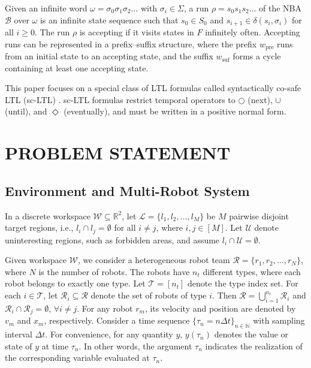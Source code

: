 \documentclass[lettersize,journal]{IEEEtran}
\begin{document}
Given an infinite word $\omega = \sigma_0\sigma_1\sigma_2\dots$ with $\sigma_i \in \Sigma$, a run $\rho = s_0s_1s_2\dots$ of the NBA $\mathcal{B}$ over $\omega$ is an infinite state sequence such that $s_0 \in S_0$ and $s_{i+1} \in \delta(s_i,\sigma_i)$ for all $i \ge 0$. The run $\rho$ is accepting if it visits states in $F$ infinitely often.
Accepting runs can be represented in a prefix–suffix structure, where the prefix $w_{\text{pre}}$ runs from an initial state to an accepting state, and the suffix $w_{\text{suf}}$ forms a cycle containing at least one accepting state.

This paper focuses on a special class of LTL formulas called syntactically co-safe LTL (sc-LTL) \cite{belta2017formal}. sc-LTL formulas restrict temporal operators to $\bigcirc$ (next), $\cup$ (until), and $\Diamond$ (eventually), and must be written in a positive normal form.


\section{PROBLEM STATEMENT}

\subsection{Environment and Multi-Robot System}
In a discrete workspace $\mathcal{W} \subseteq \mathbb{R}^2$, let $\mathcal{L}=\{l_1,l_2,\dots,l_M\}$ be $M$ pairwise disjoint target regions, i.e., $l_i\cap l_j=\emptyset$ for all $i\neq j$, where $i,j\in[M]$. Let $\mathcal{U}$ denote uninteresting regions, such as forbidden areas, and assume $l_i\cap\mathcal{U}=\emptyset$.

Given workspace $\mathcal{W}$, we consider a heterogeneous robot team $\mathcal{R} = \{ r_1, r_2, \dots, r_N\}$, where $N$ is the number of robots. The robots have $n_t$ different types, where each robot belongs to exactly one type. Let $\mathcal{T}=[n_t]$ denote the type index set. For each $i\in\mathcal{T}$, let $\mathcal{R}_i\subseteq\mathcal{R}$ denote the set of robots of type $i$. Then $\mathcal{R}=\bigcup_{i=1}^{n_t}\mathcal{R}_i$ and $\mathcal{R}_i\cap\mathcal{R}_j=\emptyset$, $\forall i\neq j$. For any robot $r_m$, its velocity and position are denoted by $v_m$ and $x_m$, respectively.
Consider a time sequence $\{ \tau_n = n \Delta t \}_{n \in \mathbb{N}}$ with sampling interval $\Delta t$.
For convenience, for any quantity $y$, $y(\tau_n)$ denotes the value or state of $y$ at time $\tau_n$. In other words, the argument $\tau_n$ indicates the realization of the corresponding variable evaluated at $\tau_n$.
\end{document}
